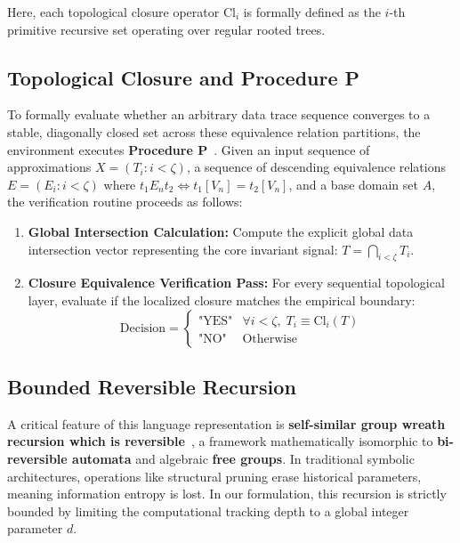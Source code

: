 \documentclass[twocolumn]{article}
\begin{document}
Here, each topological closure operator $\text{Cl}_i$ is formally defined as the $i$-th primitive recursive set operating over regular rooted trees.

\subsection{Topological Closure and Procedure P}
To formally evaluate whether an arbitrary data trace sequence converges to a stable, diagonally closed set across these equivalence relation partitions, the environment executes \textbf{Procedure P}~\cite{marek1986}. Given an input sequence of approximations $X = (T_i : i < \zeta)$, a sequence of descending equivalence relations $E = (E_i : i < \zeta)$ where $t_1 E_n t_2 \iff t_1[V_n] = t_2[V_n]$, and a base domain set $A$, the verification routine proceeds as follows:
\begin{enumerate}
    \item \textbf{Global Intersection Calculation:} Compute the explicit global data intersection vector representing the core invariant signal: $T = \bigcap_{i < \zeta} T_i$.
    \item \textbf{Closure Equivalence Verification Pass:} For every sequential topological layer, evaluate if the localized closure matches the empirical boundary:
    \begin{equation}
        \text{Decision} = \begin{cases} \text{"YES"} & \forall i < \zeta, \; T_i \equiv \text{Cl}_i(T) \\ \text{"NO"} & \text{Otherwise} \end{cases}
    \end{equation}
\end{enumerate}

\subsection{Bounded Reversible Recursion}
A critical feature of this language representation is \textbf{self-similar group wreath recursion which is reversible}~\cite{dallachiara2007}, a framework mathematically isomorphic to \textbf{bi-reversible automata} and algebraic \textbf{free groups}. In traditional symbolic architectures, operations like structural pruning erase historical parameters, meaning information entropy is lost. In our formulation, this recursion is strictly bounded by limiting the computational tracking depth to a global integer parameter $d$. 
\end{document}
